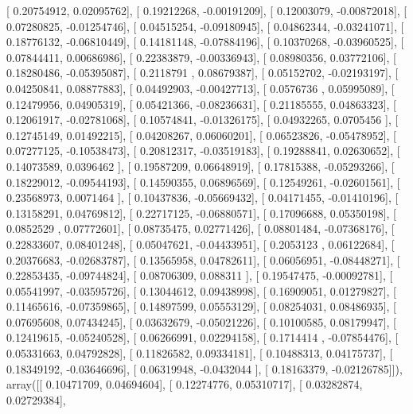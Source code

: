 \documentclass{article}
\begin{document}
       [ 0.20754912,  0.02095762],
       [ 0.19212268, -0.00191209],
       [ 0.12003079, -0.00872018],
       [ 0.07280825, -0.01254746],
       [ 0.04515254, -0.09180945],
       [ 0.04862344, -0.03241071],
       [ 0.18776132, -0.06810449],
       [ 0.14181148, -0.07884196],
       [ 0.10370268, -0.03960525],
       [ 0.07844411,  0.00686986],
       [ 0.22383879, -0.00336943],
       [ 0.08980356,  0.03772106],
       [ 0.18280486, -0.05395087],
       [ 0.2118791 ,  0.08679387],
       [ 0.05152702, -0.02193197],
       [ 0.04250841,  0.08877883],
       [ 0.04492903, -0.00427713],
       [ 0.0576736 ,  0.05995089],
       [ 0.12479956,  0.04905319],
       [ 0.05421366, -0.08236631],
       [ 0.21185555,  0.04863323],
       [ 0.12061917, -0.02781068],
       [ 0.10574841, -0.01326175],
       [ 0.04932265,  0.0705456 ],
       [ 0.12745149,  0.01492215],
       [ 0.04208267,  0.06060201],
       [ 0.06523826, -0.05478952],
       [ 0.07277125, -0.10538473],
       [ 0.20812317, -0.03519183],
       [ 0.19288841,  0.02630652],
       [ 0.14073589,  0.0396462 ],
       [ 0.19587209,  0.06648919],
       [ 0.17815388, -0.05293266],
       [ 0.18229012, -0.09544193],
       [ 0.14590355,  0.06896569],
       [ 0.12549261, -0.02601561],
       [ 0.23568973,  0.0071464 ],
       [ 0.10437836, -0.05669432],
       [ 0.04171455, -0.01410196],
       [ 0.13158291,  0.04769812],
       [ 0.22717125, -0.06880571],
       [ 0.17096688,  0.05350198],
       [ 0.0852529 ,  0.07772601],
       [ 0.08735475,  0.02771426],
       [ 0.08801484, -0.07368176],
       [ 0.22833607,  0.08401248],
       [ 0.05047621, -0.04433951],
       [ 0.2053123 ,  0.06122684],
       [ 0.20376683, -0.02683787],
       [ 0.13565958,  0.04782611],
       [ 0.06056951, -0.08448271],
       [ 0.22853435, -0.09744824],
       [ 0.08706309,  0.088311  ],
       [ 0.19547475, -0.00092781],
       [ 0.05541997, -0.03595726],
       [ 0.13044612,  0.09438998],
       [ 0.16909051,  0.01279827],
       [ 0.11465616, -0.07359865],
       [ 0.14897599,  0.05553129],
       [ 0.08254031,  0.08486935],
       [ 0.07695608,  0.07434245],
       [ 0.03632679, -0.05021226],
       [ 0.10100585,  0.08179947],
       [ 0.12419615, -0.05240528],
       [ 0.06266991,  0.02294158],
       [ 0.1714414 , -0.07854476],
       [ 0.05331663,  0.04792828],
       [ 0.11826582,  0.09334181],
       [ 0.10488313,  0.04175737],
       [ 0.18349192, -0.03646696],
       [ 0.06319948, -0.0432044 ],
       [ 0.18163379, -0.02126785]]), array([[ 0.10471709,  0.04694604],
       [ 0.12274776,  0.05310717],
       [ 0.03282874,  0.02729384],
\end{document}
